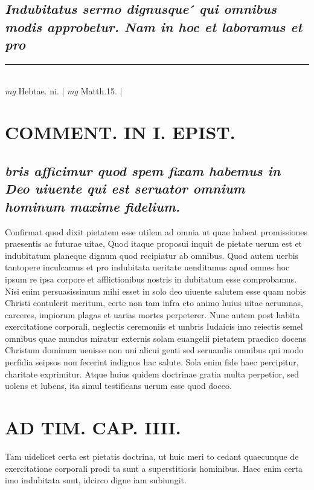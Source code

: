 \documentclass{article}
\begin{document}
\begin{pages}
\subsection*{\textit{Indubitatus sermo dignusque ́ qui omnibus modis approbetur. Nam in hoc et laboramus et pro}}
\vspace{0.5cm}\noindent
\vspace{0.2cm}\rule{1cm}{0.2pt}\\ 
\hspace{0.2cm}\textit{mg}
\footnotesize Hebtae. ni. 
\normalsize| 
\hspace{0.2cm}\textit{mg}
\footnotesize Matth.15. 
\normalsize| 
\section*{COMMENT. IN I. EPIST. }
{}
\subsection*{\textit{bris afficimur quod spem fixam habemus in Deo uiuente qui est seruator omnium hominum maxime fidelium. }}\pstart Confirmat quod dixit pietatem esse utilem ad omnia ut quae habeat promissiones praesentis ac futurae uitae, Quod itaque proposui inquit de pietate uerum est et indubitatum planeque dignum quod recipiatur ab omnibus. Quod autem uerbis tantopere inculcamus et pro indubitata ueritate uenditamus apud omnes hoc ipsum re ipsa corpore et afflictionibus nostris in dubitatum esse comprobamus. Nisi enim persuasissimum mihi esset in solo deo uiuente salutem esse quam nobis Christi contulerit meritum, certe non tam infra cto animo huius uitae aerumnas, carceres, impiorum plagas et uarias mortes perpeterer. Nunc autem post habita exercitatione corporali, neglectis ceremoniis et umbris Iudaicis imo reiectis semel omnibus quae mundus miratur externis solam euangelii pietatem praedico docens Christum dominum uenisse non uni alicui genti sed seruandis omnibus qui modo perfidia seipsos non fecerint indignos hac salute. Sola enim fide haec percipitur, charitate exprimitur. Atque huius quidem doctrinae gratia multa perpetior, sed uolens et lubens, ita simul testificans uerum esse quod doceo.  \pend
\section*{AD TIM. CAP. IIII. }
\marginpar{[ p.144 ]}\pstart Tam uidelicet certa est pietatis doctrina, ut huic meri to cedant quaecunque de exercitatione corporali prodi ta sunt a superstitiosis hominibus. Haec enim certa imo indubitata sunt, idcirco digne iam subiungit.  \pend
{}
{}

\end{pages}
\end{document}
